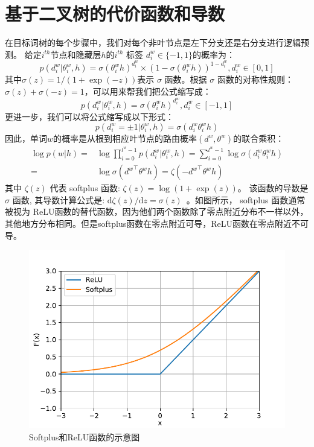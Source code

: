 \section{基于二叉树的代价函数和导数}
在目标词树的每个步骤中，我们对每个非叶节点是左下分支还是右分支进行逻辑预测。 给定$ i^{th} $节点和隐藏层$ h $的$ i^{th} $ 标签 $d^w_i\in \{-1,1\}$的概率为：
 \begin{equation}
p(d^w_i|\theta_{i}^w,h) =\sigma(\theta_{i}^w h)^{d_i^w}\times(1-\sigma(\theta_{i}^w h))^{1-{d_i^w}},d_i^w \in [0,1]
\end{equation}
其中$ \sigma(z)= 1 /(1 + \exp(-z))$表示 $\sigma$ 函数。根据 $\sigma$ 函数的对称性规则：$\sigma(z)+ \sigma(-z)=1 $，可以用来帮我们把公式缩写成：
 \begin{equation}
p(d^w_i|\theta_{i}^w,h) =\sigma(\theta_{i}^w h)^{d_i^w}, d_i^w \in [-1,1]
\end{equation}
更进一步，我们可以将公式缩写成以下形式：
\begin{equation}
p(d^w_i=\pm 1|\theta_{i}^w,h) = \sigma({d_i^w}\theta_{i}^w h)
\end{equation}
 因此，单词$ w $的概率是从根到相应叶节点的路由概率$(d^w,\theta^w)$的联合乘积：
\begin{equation}\label{equ:pw}
\begin{split}
 \log p(w|h)=&\log\prod_{i=0}^{l^w-1} p(d^w_i|\theta_{i}^w,h) = \sum_{i=0}^{l^w -1} \log\sigma(d_i^w \theta_{i}^w h)\\
 =&\log\sigma({d^w}^\top \theta^w h)=\zeta(- {d^w}^\top \theta^w h )
 \end{split}
\end{equation}
其中 $\zeta(z)$ 代表 softplus 函数: $\zeta(z)= \log (1+\exp(z))$。 该函数的导数是 $\sigma$ 函数, 其导数计算公式是: ${\mathrm{d}\zeta(z)}/{\mathrm{d} z}= \sigma(z)$~。如图所示， softplus 函数通常被视为 ReLU函数的替代函数，因为他们两个函数除了零点附近分布不一样以外，其他地方分布相同。但是softplus函数在零点附近可导，ReLU函数在零点附近不可导。
\begin{figure}[!ht]
  \centering
\includegraphics[width=0.6\linewidth]{./figures/relus.pdf}
\caption{Softplus和ReLU函数的示意图}\label{fig:soft}
\end{figure}

